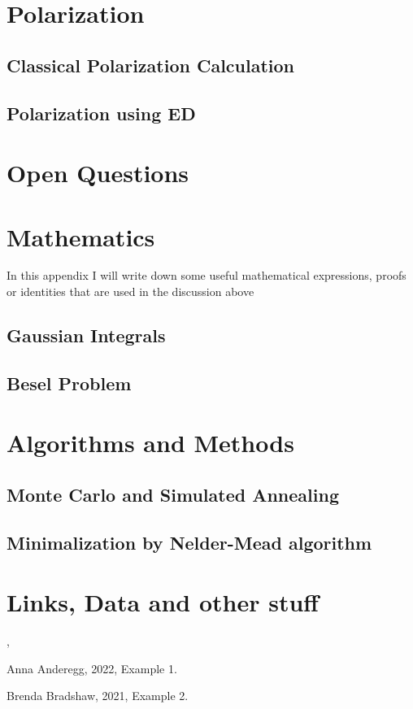 \newpage
\section{Polarization}
	\subsection{Classical Polarization Calculation}
	\subsection{Polarization using ED}
	
\newpage
\section{Open Questions}

\newpage	
\appendix
\section{Mathematics}
	In this appendix I will write down some useful mathematical expressions, proofs or identities that are used in the discussion above
		\subsection{Gaussian Integrals}
		\subsection{Besel Problem}
			

\newpage		
\section{Algorithms and Methods}
		\subsection{Monte Carlo and Simulated Annealing}
		\subsection{Minimalization by Nelder-Mead algorithm}

\newpage
\section{Links, Data and other stuff}	




\cite{aa}, \cite{bb}

\newpage
\begin{thebibliography}{3}

 Anna Anderegg, 2022, Example 1.

 Brenda Bradshaw, 2021, Example 2.

\end{thebibliography}

